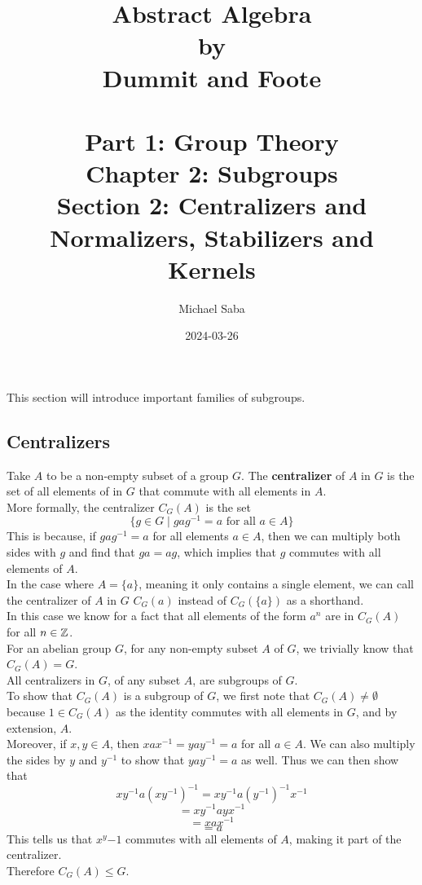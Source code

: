 \documentclass[12pt]{article}
\title{
    \Huge Abstract Algebra \\
    \large by \\
    \Large Dummit and Foote \\~\\
    \huge Part 1: Group Theory \\
    \LARGE Chapter 2: Subgroups \\
    \Large Section 2: Centralizers and Normalizers, Stabilizers and Kernels
}
\date{2024-03-26}
\author{Michael Saba}
\begin{document}
    \maketitle
    \newpage
    \setlength{\parindent}{0pt}

    This section will introduce important families of subgroups. \\

    \subsection*{Centralizers}

    Take $A$ to be a non-empty subset of a group $G$.
    The \textbf{centralizer} of $A$ in $G$
    is the set of all elements of in $G$ that commute with all
    elements in $A$. \\
    More formally, the centralizer $C_G(A)$ is the set
    \[ \{ g \in G \mid gag^{-1} = a \text{ for all } a \in A \} \]
    This is because, if $gag^{-1} = a$ for all elements $a \in A$,
    then we can multiply both sides with $g$
    and find that $ga = ag$,
    which implies that $g$ commutes with all elements of $A$. \\

    In the case where $A = \{a\}$,
    meaning it only contains a single element,
    we can call the centralizer of $A$ in $G$
    $C_G(a)$ instead of $C_G(\{a\})$
    as a shorthand. \\
    In this case we know for a fact that all elements
    of the form $a^n$ are in $C_G(A)$ for all $n \in \mathbb{Z}$. \\

    For an abelian group $G$,
    for any non-empty subset $A$ of $G$,
    we trivially know that $C_G(A) = G$. \\

    All centralizers in $G$, of any subset $A$,
    are subgroups of $G$. \\
    To show that $C_G(A)$ is a subgroup of $G$,
    we first note that $C_G(A) \neq \emptyset$
    because $1 \in C_G(A)$ as the identity
    commutes with all elements in $G$,
    and by extension, $A$. \\
    Moreover, if $x, y \in A$,
    then $xax^{-1} = yay^{-1} = a$ for all $a \in A$.
    We can also multiply the sides by $y$ and $y^{-1}$
    to show that $yay^{-1} = a$ as well.
    Thus we can then show that
    \[ xy^{-1}a(xy^{-1})^{-1} = xy^{-1}a(y^{-1})^{-1}x^{-1} \]
    \[ = xy^{-1}ayx^{-1} \]
    \[ = xax^{-1} \]
    \[ = a \]
    This tells us that $x^y{-1}$ commutes with all elements of $A$,
    making it part of the centralizer. \\
    Therefore $C_G(A) \leqslant G$. \\
\end{document}

